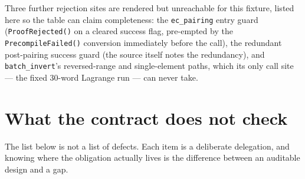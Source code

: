 \documentclass[11pt,a4paper]{article}
\newcommand{\code}[1]{\texttt{#1}}
\newcommand{\err}[1]{\textcolor{red!60!black}{\texttt{#1}}}
\theoremstyle{definition}
\begin{document}
\noindent
Three further rejection sites are rendered but unreachable for this fixture,
listed here so the table can claim completeness: the \code{ec\_pairing} entry
guard (\err{ProofRejected()} on a cleared success flag, pre-empted by the
\err{PrecompileFailed()} conversion immediately before the call), the
redundant post-pairing success guard (the source itself notes the redundancy),
and \code{batch\_invert}'s reversed-range and single-element paths, which its
only call site --- the fixed $30$-word Lagrange run --- can never take.

\section{What the contract does not check}
\label{sec:notchecked}

The list below is not a list of defects. Each item is a deliberate delegation,
and knowing where the obligation actually lives is the difference between an
auditable design and a gap.
\end{document}
